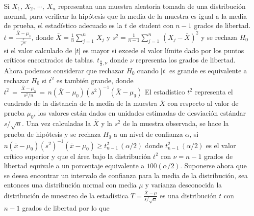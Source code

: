 \documentclass[english]{report}
\begin{document}
Si $X_1,\,X_2,\,\cdots,\,X_n$ representan una muestra aleatoria tomada de una distribución normal, para verificar la hipótesis que la media de la muestra es igual a la media de prueba, el estadístico adecuado es la $t$ de student con $n-1$ grados de libertad.
\vspace{5pt}
$t=\frac{\bar{X}-\mu_0}{\frac{s}{\sqrt{n}}}$, 
\vspace{5pt}
donde
\vspace{5pt}
$\bar{X}= \frac{1}{n}\sum_{j=1}^n\,X_j$ 
\vspace{5pt}
y
\vspace{5pt}
$s^2=\frac{1}{n-1}\sum_{j=1}^n\,(X_j-\bar{X})^2$
\vspace{5pt}
y se rechaza $H_0$ si el valor calculado de $|t|$ es mayor si excede el valor límite dado por los puntos críticos encontrados de tablas. $t_{\frac{\alpha}{2},\nu}$ donde $\nu$ representa los grados de libertad. 
\vspace{5pt}
Ahora podemos considerar que rechazar $H_0$ cuando $|t|$ es grande es equivalente a rechazar $H_0$ si $t^2$ es también grande, donde
\vspace{5pt}
$t^2\,=\,\frac{\bar{X}-\mu_0}{s^2/n}\,=\,n(\bar{X}-\mu_0)(s^2)^{-1}(\bar{X}-\mu_0)$  
\vspace{5pt}
El estadístico $t^2$ representa el cuadrado de la distancia de la media de la muestra $\bar{X}$ con respecto al valor de prueba $\mu_0$, los valores están dados en unidades estimadas de desviación estándar $s/\sqrt{n}$.
\vspace{5pt}
Una vez calculadas la $\bar{X}$ y la $s^2$ de la muestra observada, se hace la prueba de hipótesis y se rechaza $H_0$ a un nivel de confianza $\alpha$, si
\vspace{5pt}
$n(\bar{x}-\mu_0)(s^2)^{-1}(\bar{x}-\mu_0) \geq t^2_{n-1}\,(\alpha/2)$
\vspace{5pt}
donde $t^2_{n-1}\,(\alpha/2)$ es el valor crítico superior y que el área bajo la distribución $t^2$ con $\nu=n-1$ grados de libertad equivale a un porcentaje equivalente a $100(\alpha/2)$.
\vspace{5pt}
Suponerse ahora que se desea encontrar un intervalo de confianza para la media de la distribución, sea entonces una distribución normal con media $\mu$ y varianza desconocida la distribución de muestreo de la estadística
\vspace{5pt}
$T=\frac{\bar{X}-\mu}{s/\sqrt{n}}$   
\vspace{5pt}
es una distribución $t$ con $n-1$ grados de libertad por lo que 
\vspace{5pt}
\end{document}
